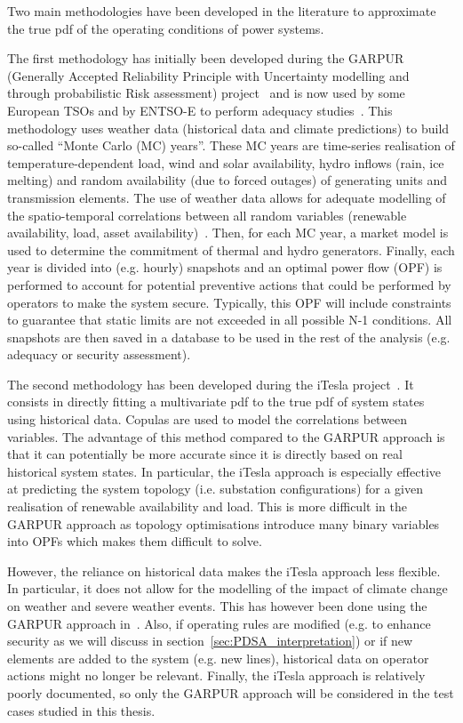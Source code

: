 Two main methodologies have been developed in the literature to approximate the true pdf of the operating conditions of power systems.

The first methodology has initially been developed during the GARPUR (Generally Accepted Reliability Principle with Uncertainty modelling and through probabilistic Risk assessment) project~\cite{StrathElia, StrathGARPUR} and is now used by some European TSOs and by ENTSO-E to perform adequacy studies~\cite{ACER_MC_year, EliaAdequacy, ENTSOE_MC_year}. This methodology uses weather data (historical data and climate predictions) to build so-called ``Monte Carlo (MC) years''. These MC years are time-series realisation of temperature-dependent load, wind and solar availability, hydro inflows (rain, ice melting) and random availability (due to forced outages) of generating units and transmission elements. The use of weather data allows for adequate modelling of the spatio-temporal correlations between all random variables (renewable availability, load, asset availability)~\cite{StrathGARPUR, ENTSOE_MC_year}. Then, for each MC year, a market model is used to determine the commitment of thermal and hydro generators. Finally, each year is divided into (e.g. hourly) snapshots and an optimal power flow (OPF) is performed to account for potential preventive actions that could be performed by operators to make the system secure. Typically, this OPF will include constraints to guarantee that static limits are not exceeded in all possible N-1 conditions. All snapshots are then saved in a database to be used in the rest of the analysis (e.g. adequacy or security assessment).


The second methodology has been developed during the iTesla project~\cite{KonstantelosCopulas, EurostagHPC, iTesla_uncertainties}. It consists in directly fitting a multivariate pdf to the true pdf of system states using historical data. Copulas are used to model the correlations between variables. The advantage of this method compared to the GARPUR approach is that it can potentially be more accurate since it is directly based on real historical system states. In particular, the iTesla approach is especially effective at predicting the system topology (i.e. substation configurations) for a given realisation of renewable availability and load. This is more difficult in the GARPUR approach as topology optimisations introduce many binary variables into OPFs which makes them difficult to solve.

However, the reliance on historical data makes the iTesla approach less flexible. In particular, it does not allow for the modelling of the impact of climate change on weather and severe weather events. This has however been done using the GARPUR approach in~\cite{ENTSOE_MC_year}. Also, if operating rules are modified (e.g. to enhance security as we will discuss in section~\ref{sec:PDSA_interpretation}) or if new elements are added to the system (e.g. new lines), historical data on operator actions might no longer be relevant. Finally, the iTesla approach is relatively poorly documented, so only the GARPUR approach will be considered in the test cases studied in this thesis.

